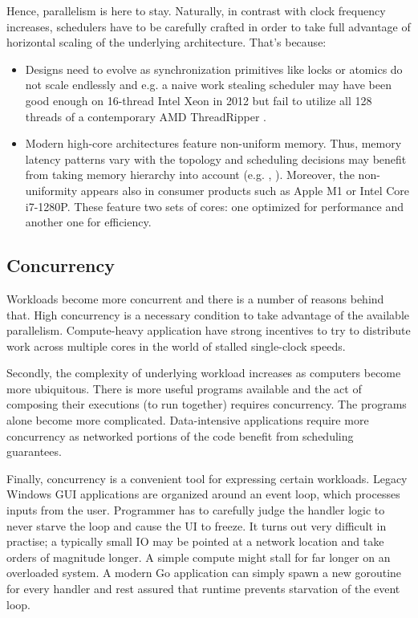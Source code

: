 \documentclass[12pt,a4paper,twoside]{report}
\begin{document}
Hence, parallelism is here to stay. Naturally, in contrast with clock frequency increases, schedulers have to be carefully crafted in order to take full advantage of horizontal scaling of the underlying architecture. That's because:
\begin{itemize}
    \item Designs need to evolve as synchronization primitives like locks or atomics do not scale endlessly and e.g. a naive work stealing scheduler may have been good enough on 16-thread Intel Xeon in 2012 but fail to utilize all 128 threads of a contemporary AMD ThreadRipper  \cite{Castello2016}. 
    \item Modern high-core architectures feature non-uniform memory. Thus, memory latency patterns vary with the topology and scheduling decisions may benefit from taking memory hierarchy into account (e.g. \cite{Drebes2016}, \cite{faverge:inria-00416502}). Moreover, the non-uniformity appears also in consumer products such as Apple M1 or Intel Core i7-1280P. These feature two sets of cores: one optimized for performance and another one for efficiency.
\end{itemize}

\subsection{Concurrency}
\label{section:intr_software_conc}
Workloads become more concurrent and there is a number of reasons behind that. High concurrency is a necessary condition to take advantage of the available parallelism. Compute-heavy application have strong incentives to try to distribute work across multiple cores in the world of stalled single-clock speeds. 

Secondly, the complexity of underlying workload increases as computers become more ubiquitous. There is more useful programs available and the act of composing their executions (to run together) requires concurrency. The programs alone become more complicated. Data-intensive applications \cite{Kleppmann2017-en} require more concurrency as networked portions of the code benefit from scheduling guarantees. 

Finally, concurrency is a convenient tool for expressing certain workloads. Legacy Windows GUI applications are organized around an event loop, which processes inputs from the user. Programmer has to carefully judge the handler logic to never starve the loop and cause the UI to freeze. It turns out very difficult in practise; a typically small IO may be pointed at a network location and take orders of magnitude longer. A simple compute might stall for far longer on an overloaded system. A modern Go application can simply spawn a new goroutine for every handler and rest assured that runtime prevents starvation of the event loop.  
\end{document}

